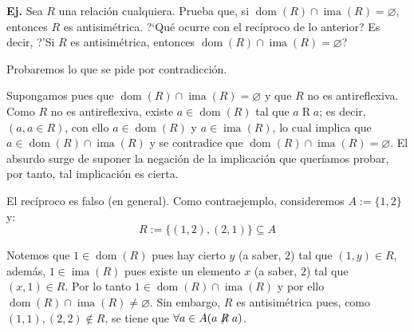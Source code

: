 \documentclass[letterpaper,DIV=14,headsepline,12pt]{scrartcl}
\makeatletter
\newcounter{Ejer}
\newcommand{\pts}{}
\newenvironment{ejercicio}[1]{\noindent
    \ifthenelse{\equal{#1}{1} \OR \equal{#1}{+1}}{\renewcommand{\pts}{\textbf{(#1 pt)}}}{\renewcommand{\pts}{\textbf{(#1 pts)}}}\textbf{Ej. \theEjer} \pts\stepcounter{Ejer}}{\vspace{.3cm}}
\renewenvironment{proof}[1][]{%
        \par\pushQED{\qed}%
        \normalfont\topsep6pt \partopsep0pt %
        \trivlist
        \item[\hskip\labelsep
                \textbf{\textit{Demostración.}}%
        ]#1
        }{%
        \popQED\endtrivlist\@endpefalse
    }
\renewcommand{\emptyset}{\varnothing}
\DeclareMathOperator{\ima}{ima}
\DeclareMathOperator{\dom}{dom}
\makeatother
\begin{document}
    \begin{ejercicio}{1}
        Sea $R$ una relación cualquiera. Prueba que, si $\dom(R) \cap \ima(R) =
        \emptyset$, entonces $R$ es antisimétrica. ?`Qué ocurre con el recíproco
        de lo anterior? Es decir, ?'Si $R$ es antisimétrica, entonces $\dom(R)
        \cap \ima(R) = \emptyset$?
    \end{ejercicio}
    \begin{proof}
        Probaremos lo que se pide por contradicción.
        
        Supongamos pues que $\dom(R)\cap\ima(R)=\emptyset$ y que $R$ no es antireflexiva. Como $R$ no es antireflexiva, existe $a \in \dom(R)$ tal que $a \mathrel{R} a$; es decir, $(a,a \in R)$, con ello $a \in \dom(R)$ y $a \in \ima(R)$, lo cual implica que $a \in \dom(R) \cap \ima(R)$ y se contradice que $\dom(R)\cap\ima(R)=\emptyset$. El absurdo surge de suponer la negación de la implicación que queríamos probar, por tanto, tal implicación es cierta.

        El recíproco es falso (en general). Como contraejemplo, consideremos $A:=\{1,2\}$ y:
        \[ R:=\{(1,2),(2,1)\} \subseteq A \]

        Notemos que $1 \in \dom(R)$ pues hay cierto $y$ (a saber, $2$) tal que $(1,y) \in R$, además, $1 \in \ima(R)$ pues existe un elemento $x$ (a saber, $2$) tal que $(x,1) \in R$. Por lo tanto $1 \in \dom(R) \cap \ima(R)$ y por ello $\dom(R) \cap \ima(R) \neq \emptyset$. Sin embargo, $R$ es antisimétrica pues, como $(1,1),(2,2) \notin R$, se tiene que $\forall a \in A (a \not\mathrel{R} a)$.
    \end{proof}
\end{document}

